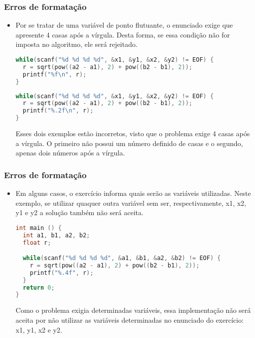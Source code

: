 \begin{frame} [fragile]
 \frametitle{Erros de formatação}
 \begin{itemize}
  \item {\small Por se tratar de uma variável de ponto flutuante, o enunciado exige que apresente 4 casas após a vírgula. Desta forma, se essa condição não for imposta no algoritmo, ele será rejeitado.}
  \begin{lstlisting}[language=c]
while(scanf("%d %d %d %d", &x1, &y1, &x2, &y2) != EOF) {
  r = sqrt(pow((a2 - a1), 2) + pow((b2 - b1), 2));
  printf("%f\n", r);
}
  \end{lstlisting}
  \begin{lstlisting}[language=c]
while(scanf("%d %d %d %d", &x1, &y1, &x2, &y2) != EOF) {
  r = sqrt(pow((a2 - a1), 2) + pow((b2 - b1), 2));
  printf("%.2f\n", r);
}
  \end{lstlisting}
  \small Esses dois exemplos estão incorretos, visto que o problema exige 4 casas após a vírgula. O primeiro não possui um número definido de casas e o segundo, apenas dois números após a vírgula.
 \end{itemize}
\end{frame}

\begin{frame} [fragile]
 \frametitle{Erros de formatação}
 \begin{itemize}
  \item Em alguns casos, o exercício informa quais serão as variáveis utilizadas. Neste exemplo, se utilizar quaquer outra variável sem ser, respectivamente, x1, x2, y1 e y2 a solução também não será aceita.
  \begin{lstlisting}[language=c]
int main () {
  int a1, b1, a2, b2;
  float r;

  while(scanf("%d %d %d %d", &a1, &b1, &a2, &b2) != EOF) {
    r = sqrt(pow((a2 - a1), 2) + pow((b2 - b1), 2));
    printf("%.4f", r);
  }
  return 0;
}
  \end{lstlisting}
  Como o problema exigia determinadas variáveis, essa implementação não será aceita por não utilizar as variáveis determinadas no enunciado do exercício: x1, y1, x2 e y2.
 \end{itemize}

\end{frame}
